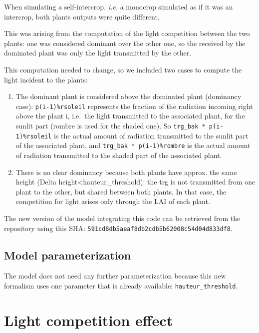 \documentclass[
]{book}
\begin{document}
When simulating a self-intercrop, \emph{i.e.} a monocrop simulated as if it was an intercrop, both plants outputs were quite different.

This was arising from the computation of the light competition between the two plants: one was considered dominant over the other one, so the received by the dominated plant was only the light transmitted by the other.

This computation needed to change, so we included two cases to compute the light incident to the plants:

\begin{enumerate}
\def\labelenumi{\arabic{enumi}.}
\item
  The dominant plant is considered above the dominated plant (dominancy case): \texttt{p(i-1)\%rsoleil} represents the fraction of the radiation incoming right above the plant i, i.e.~the light transmitted to the associated plant, for the sunlit part (rombre is used for the shaded one). So \texttt{trg\_bak\ *\ p(i-1)\%rsoleil} is the actual amount of radiation transmitted to the sunlit part of the associated plant, and \texttt{trg\_bak\ *\ p(i-1)\%rombre} is the actual amount of radiation transmitted to the shaded part of the associated plant.
\item
  There is no clear dominancy because both plants have approx. the same height (Delta height\textless hauteur\_threshold): the trg is not transmitted from one plant to the other, but shared between both plants. In that case, the competition for light arises only through the LAI of each plant.
\end{enumerate}

The new version of the model integrating this code can be retrieved from the repository using this SHA: \texttt{591cd8db5aeaf8db2cdb5b62008c54d04d833df8}.

\hypertarget{model-parameterization-1}{%
\section{Model parameterization}\label{model-parameterization-1}}

The model does not need any further parameterization because this new formalism uses one parameter that is already available: \texttt{hauteur\_threshold}.

\hypertarget{lightcompetition}{%
\chapter{Light competition effect}\label{lightcompetition}}
\end{document}

